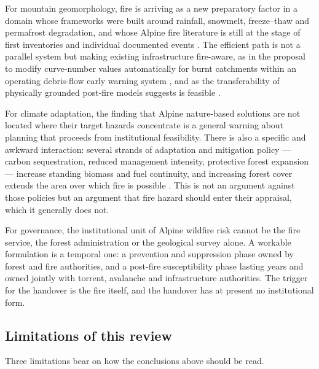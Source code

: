 \documentclass[11pt,a4paper]{article}
\begin{document}
For mountain geomorphology, fire is arriving as a new preparatory factor in a domain whose frameworks were built around rainfall, snowmelt, freeze--thaw and permafrost degradation, and whose Alpine fire literature is still at the stage of first inventories \citep{melzner_wildfire-induced_2025} and individual documented events \citep{tiranti_wildfires_2021, laporta_postwildfire_2025, melzner_brief_2019}. The efficient path is not a parallel system but making existing infrastructure fire-aware, as in the proposal to modify curve-number values automatically for burnt catchments within an operating debris-flow early warning system \citep{tiranti_wildfires_2021}, and as the transferability of physically grounded post-fire models suggests is feasible \citep{diakakis_exploring_2023}.

For climate adaptation, the finding that Alpine nature-based solutions are not located where their target hazards concentrate \citep{dubo_nature-based_2023} is a general warning about planning that proceeds from institutional feasibility. There is also a specific and awkward interaction: several strands of adaptation and mitigation policy --- carbon sequestration, reduced management intensity, protective forest expansion --- increase standing biomass and fuel continuity, and increasing forest cover extends the area over which fire is possible \citep{gerberding_mapping_2025}. This is not an argument against those policies but an argument that fire hazard should enter their appraisal, which it generally does not.

For governance, the institutional unit of Alpine wildfire risk cannot be the fire service, the forest administration or the geological survey alone. A workable formulation is a temporal one: a prevention and suppression phase owned by forest and fire authorities, and a post-fire susceptibility phase lasting years and owned jointly with torrent, avalanche and infrastructure authorities. The trigger for the handover is the fire itself, and the handover has at present no institutional form.

\subsection{Limitations of this review}

Three limitations bear on how the conclusions above should be read.
\end{document}
